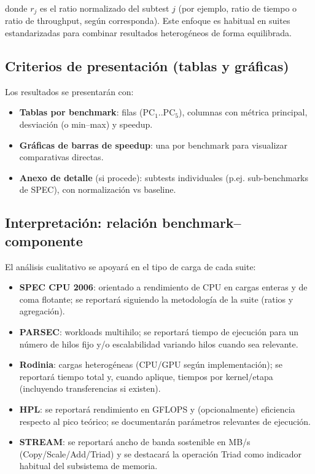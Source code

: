 \documentclass[11pt,a4paper]{article}
\begin{document}
donde $r_j$ es el ratio normalizado del subtest $j$ (por ejemplo, ratio de tiempo o ratio de throughput, según corresponda).
Este enfoque es habitual en suites estandarizadas para combinar resultados heterogéneos de forma equilibrada.

\subsection{Criterios de presentación (tablas y gráficas)}
Los resultados se presentarán con:

\begin{itemize}
  \item \textbf{Tablas por benchmark}: filas (PC$_1$..PC$_5$), columnas con métrica principal, desviación (o min--max) y speedup.
  \item \textbf{Gráficas de barras de speedup}: una por benchmark para visualizar comparativas directas.
  \item \textbf{Anexo de detalle} (si procede): subtests individuales (p.ej. sub-benchmarks de SPEC), con normalización vs baseline.
\end{itemize}

\subsection{Interpretación: relación benchmark--componente}
El análisis cualitativo se apoyará en el tipo de carga de cada suite:

\begin{itemize}
  \item \textbf{SPEC CPU 2006}: orientado a rendimiento de CPU en cargas enteras y de coma flotante; se reportará siguiendo
  la metodología de la suite (ratios y agregación).
  \item \textbf{PARSEC}: workloads multihilo; se reportará tiempo de ejecución para un número de hilos fijo y/o escalabilidad
  variando hilos cuando sea relevante.
  \item \textbf{Rodinia}: cargas heterogéneas (CPU/GPU según implementación); se reportará tiempo total y, cuando aplique,
  tiempos por kernel/etapa (incluyendo transferencias si existen).
  \item \textbf{HPL}: se reportará rendimiento en GFLOPS y (opcionalmente) eficiencia respecto al pico teórico;
  se documentarán parámetros relevantes de ejecución.
  \item \textbf{STREAM}: se reportará ancho de banda sostenible en MB/s (Copy/Scale/Add/Triad) y se destacará la operación Triad
  como indicador habitual del subsistema de memoria.
\end{itemize}
\end{document}
